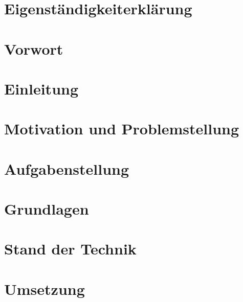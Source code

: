 \documentclass[
	ngerman,
	a4paper,
	oneside
]{scrbook}
\begin{document}
\chapter*{Eigenständigkeiterklärung}




\chapter*{Vorwort}


	\tableofcontents
	\listoffigures
	\listoftables
	\lstlistoflistings
	\printnoidxglossary[type=\acronymtype]


\chapter{Einleitung}
	
	
\chapter{Motivation und Problemstellung}	

	
	
\chapter{Aufgabenstellung}



\chapter{Grundlagen}



\chapter{Stand der Technik}



\chapter{Umsetzung}













	\printbibliography
\end{document}
